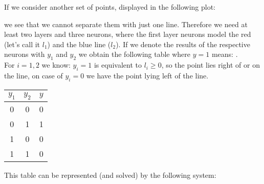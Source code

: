 \hspace*{-1.5em}
If we consider another set of points, displayed in the following plot:
\begin{figure}[H]
\centering
{}
\end{figure} \FigureHSpace
we see that we cannot separate them with just one line. Therefore we need at least two layers and three neurons, where the first layer neurons model the red (let's call it $l_1$) and the blue line ($l_2$). If we denote the results of the respective neurons with $y_1$ and $y_2$ we obtain the following table where $y=1$ means: .\\
For $i=1,2$ we know: $y_i=1$ is equivalent to $l_i\geq 0$, so the point lies right of or on the line, on case of $y_i=0$ we have the point lying left of the line.
\vspace*{2mm}
\begin{center}
\begin{tabular}{|cc|c|}
\hline
\rule[-1ex]{0pt}{2.5ex} $y_1$ & $y_2$ & $y$ \\
\hline
\rule[-1ex]{0pt}{2.5ex} 0 & 0 & 0 \\
\hline
\rule[-1ex]{0pt}{2.5ex} 0 & 1 & 1 \\
\hline
\rule[-1ex]{0pt}{2.5ex} 1 & 0 & 0 \\
\hline
\rule[-1ex]{0pt}{2.5ex} 1 & 1 & 0 \\
\hline
\end{tabular}
\end{center}
\vspace*{3mm}
This table can be represented (and solved) by the following system:
